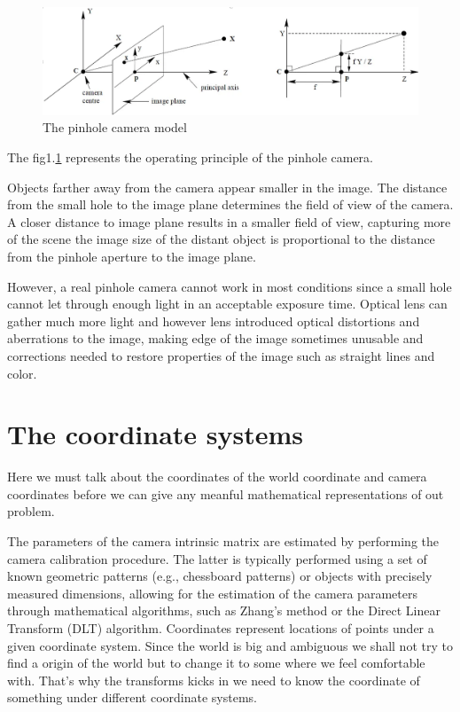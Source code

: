 \documentclass{article}
\begin{document}
\begin{figure}[h!]
    \includegraphics[width=\linewidth]{fig1.1.png}
    \caption{The pinhole camera model}\label{fig:1.1}
\end{figure}

The fig1.\ref{fig:1.1} represents the operating principle of the pinhole camera.

Objects farther away from the camera appear smaller in the image. The distance from the small hole to the image plane determines the field of view of the camera. A closer distance to image plane results in a smaller field of view, capturing more of the scene the image size of the distant object is proportional to the distance from the pinhole aperture to the image plane.

However, a real pinhole camera cannot work in most conditions since a small hole cannot let through enough light in an acceptable exposure time. Optical lens can gather much more light and however lens introduced optical distortions and aberrations to the image, making edge of the image sometimes unusable and corrections needed to restore properties of the image such as straight lines and color.

\section{The coordinate systems}
Here we must talk about the coordinates of the world coordinate and camera coordinates before we can give any meanful mathematical representations of out problem.

The parameters of the camera intrinsic matrix are estimated by performing the camera calibration procedure. The latter is typically performed using a set of known geometric patterns (e.g., chessboard patterns) or objects with precisely measured dimensions, allowing for the estimation of the camera parameters through mathematical algorithms, such as Zhang's method or the Direct Linear Transform (DLT) algorithm.
Coordinates represent locations of points under a given coordinate system. Since the world is big and ambiguous we shall not try to find a origin of the world but to change it to some where we feel comfortable with. That's why the transforms kicks in we need to know the coordinate of something under different coordinate systems.
\end{document}
